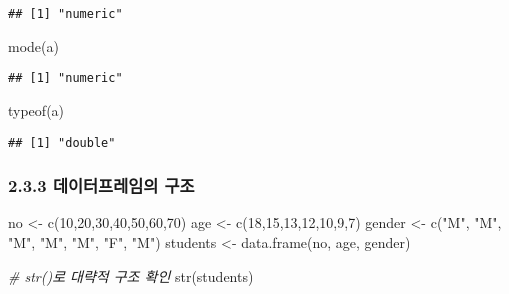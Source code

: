 \documentclass[
]{article}
\newenvironment{Shaded}{\begin{snugshade}}{\end{snugshade}}
\newcommand{\CommentTok}[1]{\textcolor[rgb]{0.56,0.35,0.01}{\textit{#1}}}
\newcommand{\DecValTok}[1]{\textcolor[rgb]{0.00,0.00,0.81}{#1}}
\newcommand{\FunctionTok}[1]{\textcolor[rgb]{0.00,0.00,0.00}{#1}}
\newcommand{\NormalTok}[1]{#1}
\newcommand{\OtherTok}[1]{\textcolor[rgb]{0.56,0.35,0.01}{#1}}
\newcommand{\StringTok}[1]{\textcolor[rgb]{0.31,0.60,0.02}{#1}}
\begin{document}
\begin{verbatim}
## [1] "numeric"
\end{verbatim}

\begin{Shaded}
\begin{Highlighting}[]
\FunctionTok{mode}\NormalTok{(a)}
\end{Highlighting}
\end{Shaded}

\begin{verbatim}
## [1] "numeric"
\end{verbatim}

\begin{Shaded}
\begin{Highlighting}[]
\FunctionTok{typeof}\NormalTok{(a)}
\end{Highlighting}
\end{Shaded}

\begin{verbatim}
## [1] "double"
\end{verbatim}

\hypertarget{uxb370uxc774uxd130uxd504uxb808uxc784uxc758-uxad6cuxc870}{%
\subsubsection{2.3.3 데이터프레임의
구조}\label{uxb370uxc774uxd130uxd504uxb808uxc784uxc758-uxad6cuxc870}}

\begin{Shaded}
\begin{Highlighting}[]
\NormalTok{no }\OtherTok{\textless{}{-}} \FunctionTok{c}\NormalTok{(}\DecValTok{10}\NormalTok{,}\DecValTok{20}\NormalTok{,}\DecValTok{30}\NormalTok{,}\DecValTok{40}\NormalTok{,}\DecValTok{50}\NormalTok{,}\DecValTok{60}\NormalTok{,}\DecValTok{70}\NormalTok{)}
\NormalTok{age }\OtherTok{\textless{}{-}} \FunctionTok{c}\NormalTok{(}\DecValTok{18}\NormalTok{,}\DecValTok{15}\NormalTok{,}\DecValTok{13}\NormalTok{,}\DecValTok{12}\NormalTok{,}\DecValTok{10}\NormalTok{,}\DecValTok{9}\NormalTok{,}\DecValTok{7}\NormalTok{)}
\NormalTok{gender }\OtherTok{\textless{}{-}} \FunctionTok{c}\NormalTok{(}\StringTok{"M"}\NormalTok{, }\StringTok{"M"}\NormalTok{, }\StringTok{"M"}\NormalTok{, }\StringTok{"M"}\NormalTok{, }\StringTok{"M"}\NormalTok{, }\StringTok{"F"}\NormalTok{, }\StringTok{"M"}\NormalTok{)}
\NormalTok{students }\OtherTok{\textless{}{-}} \FunctionTok{data.frame}\NormalTok{(no, age, gender)}

\CommentTok{\# str()로 대략적 구조 확인}
\FunctionTok{str}\NormalTok{(students)}
\end{Highlighting}
\end{Shaded}
\end{document}
